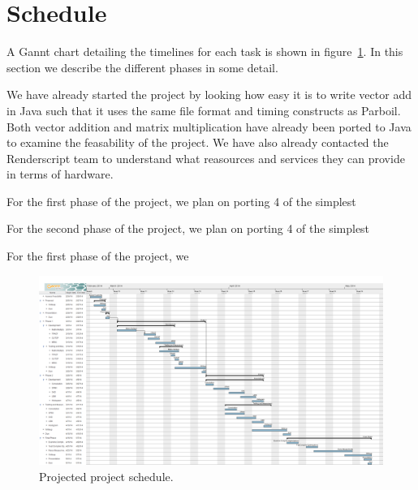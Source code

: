 
\section{Schedule}

A Gannt chart detailing the timelines for each task
  is shown in figure~\ref{fig:schedule}.
In this section we describe the different phases 
  in some detail.


We have already started the project by looking how
  easy it is to write vector add in Java such that
  it uses the same file format and timing constructs
  as Parboil.
Both vector addition and matrix multiplication have
  already been ported to Java to examine the feasability
  of the project.
We have also already contacted the Renderscript team
  to understand what reasources and services they can
  provide in terms of hardware.

For the first phase of the project, we plan on porting
  4 of the simplest 


For the second phase of the project, we plan on porting
  4 of the simplest 

For the first phase of the project, we 

\begin{figure}[t!]
\includegraphics[scale=0.2, angle=90]{chart.png}
\caption{Projected project schedule.}
\label{fig:schedule}
\centering
\end{figure}
